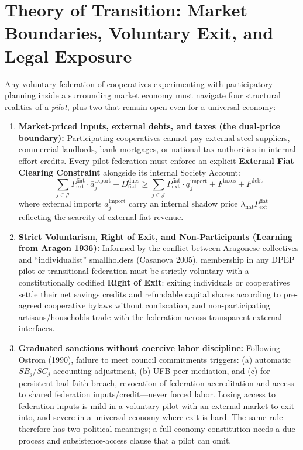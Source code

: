 \documentclass[10pt,twoside,openany]{book}
\theoremstyle{dpepstyle}
\begin{document}
\section{Theory of Transition: Market Boundaries, Voluntary Exit, and Legal Exposure}
\label{sec:transition}

Any voluntary federation of cooperatives experimenting with participatory planning inside a surrounding market economy must navigate four structural realities of a \emph{pilot}, plus two that remain open even for a universal economy:
\begin{enumerate}[leftmargin=1.8em,itemsep=3pt]
  \item \textbf{Market-priced inputs, external debts, and taxes (the dual-price boundary):}
  Participating cooperatives cannot pay external steel suppliers, commercial landlords, bank mortgages, or national tax authorities in internal effort credits. Every pilot federation must enforce an explicit \textbf{External Fiat Clearing Constraint} alongside its internal Society Account:
  \begin{equation}
    \sum_{j \in \mathcal{J}} P_{\text{ext}}^{\text{fiat}} \cdot \bar{a}_j^{\text{export}} + D_{\text{fiat}}^{\text{dues}} \ge \sum_{j \in \mathcal{J}} P_{\text{ext}}^{\text{fiat}} \cdot \underline{a}_j^{\text{import}} + F^{\text{taxes}} + F^{\text{debt}} \label{eq:fiat-bridge}
  \end{equation}
  where external imports $\underline{a}_j^{\text{import}}$ carry an internal shadow price $\lambda_{\text{fiat}} P_{\text{ext}}^{\text{fiat}}$ reflecting the scarcity of external fiat revenue.
  \item \textbf{Strict Voluntarism, Right of Exit, and Non-Participants (Learning from Aragon 1936):}
  Informed by the conflict between Aragonese collectives and ``individualist'' smallholders (Casanova 2005), membership in any DPEP pilot or transitional federation must be strictly voluntary with a constitutionally codified \textbf{Right of Exit}: exiting individuals or cooperatives settle their net savings credits and refundable capital shares according to pre-agreed cooperative bylaws without confiscation, and non-participating artisans/households trade with the federation across transparent external interfaces.
  \item \textbf{Graduated sanctions without coercive labor discipline:}
  Following Ostrom (1990), failure to meet council commitments triggers: (a) automatic $SB_j/SC_j$ accounting adjustment, (b) UFB peer mediation, and (c) for persistent bad-faith breach, revocation of federation accreditation and access to shared federation inputs/credit---never forced labor. Losing access to federation inputs is mild in a voluntary pilot with an external market to exit into, and severe in a universal economy where exit is hard. The same rule therefore has two political meanings; a full-economy constitution needs a due-process and subsistence-access clause that a pilot can omit.

\end{enumerate}
\end{document}

